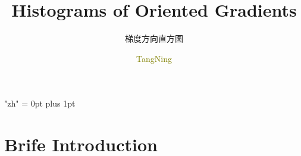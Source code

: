 \documentclass[notheorems,serif,table,compress]{beamer}  %
\begin{document}
\XeTeXlinebreaklocale "zh"         %
\XeTeXlinebreakskip = 0pt plus 1pt %
%


\title{Histograms of Oriented Gradients}
\subtitle{梯度方向直方图}
\author[]{\textcolor{olive}{TangNing}}
\frame{ \titlepage }
\def\hilite<#1>{\temporal<#1>{\color{blue!15}}{\color{black}}{\color{black}}}
\newcommand{\shadow}[2][purple]{\hskip5pt\shadowbox{\color{#1}\small \kai #2\vspace{3mm}}}
\newcommand{\colorrbox}[2][purple]{\doublebox{\color{#1}\small \kai#2}}


\section{Brife Introduction}
\end{document}
